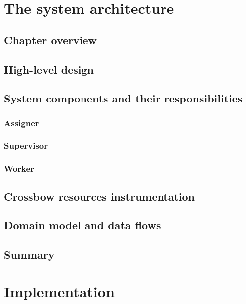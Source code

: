 \documentclass[11pt]{book}
\begin{document}
  \chapter{The system architecture}

    \section*{Chapter overview}



    \section{High-level design}


    \section{System components and their responsibilities}

      \subsection{Assigner}

      \subsection{Supervisor}

      \subsection{Worker}


    \section{Crossbow resources instrumentation}


    \section{Domain model and data flows}


    \section*{Summary}


  \chapter{Implementation}
    
\end{document}
